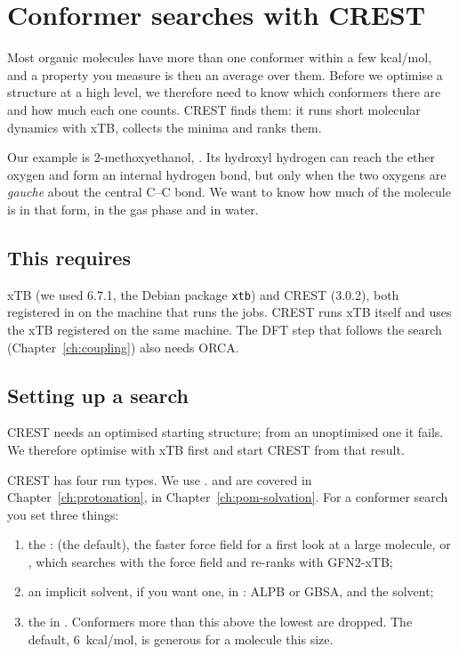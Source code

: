 \chapter{Conformer searches with CREST}
\label{ch:crest}

Most organic molecules have more than one conformer within a few kcal/mol, and a property you measure is then an average over them. Before we optimise a structure at a high level, we therefore need to know which conformers there are and how much each one counts. CREST \cite{pracht2020} finds them: it runs short molecular dynamics with xTB, collects the minima and ranks them.

Our example is 2-methoxyethanol, . Its hydroxyl hydrogen can reach the ether oxygen and form an internal hydrogen bond, but only when the two oxygens are \emph{gauche} about the central C--C bond. We want to know how much of the molecule is in that form, in the gas phase and in water.

\section*{This requires}
xTB (we used 6.7.1, the Debian package \texttt{xtb}) and CREST (3.0.2), both registered in  on the machine that runs the jobs. CREST runs xTB itself and uses the xTB registered on the same machine. The DFT step that follows the search (Chapter~\ref{ch:coupling}) also needs ORCA.

\section{Setting up a search}

CREST needs an optimised starting structure; from an unoptimised one it fails. We therefore optimise with xTB first and start CREST from that result.

CREST has four run types. We use .  and  are covered in Chapter~\ref{ch:protonation},  in Chapter~\ref{ch:pom-solvation}. For a conformer search you set three things:
\begin{enumerate}
	\item the :  (the default), the faster force field  for a first look at a large molecule, or , which searches with the force field and re-ranks with GFN2-xTB;
	\item an implicit solvent, if you want one, in : ALPB or GBSA, and the solvent;
	\item the  in . Conformers more than this above the lowest are dropped. The default, 6~kcal/mol, is generous for a molecule this size.
\end{enumerate}


